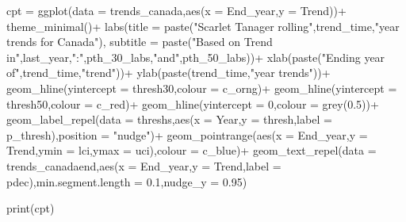 \documentclass[
]{book}
\newenvironment{Shaded}{\begin{snugshade}}{\end{snugshade}}
\newcommand{\AttributeTok}[1]{\textcolor[rgb]{0.77,0.63,0.00}{#1}}
\newcommand{\DecValTok}[1]{\textcolor[rgb]{0.00,0.00,0.81}{#1}}
\newcommand{\FloatTok}[1]{\textcolor[rgb]{0.00,0.00,0.81}{#1}}
\newcommand{\FunctionTok}[1]{\textcolor[rgb]{0.00,0.00,0.00}{#1}}
\newcommand{\NormalTok}[1]{#1}
\newcommand{\OtherTok}[1]{\textcolor[rgb]{0.56,0.35,0.01}{#1}}
\newcommand{\SpecialCharTok}[1]{\textcolor[rgb]{0.00,0.00,0.00}{#1}}
\newcommand{\StringTok}[1]{\textcolor[rgb]{0.31,0.60,0.02}{#1}}
\begin{document}
\begin{Shaded}
\begin{Highlighting}[]
      
\NormalTok{    cpt }\OtherTok{=} \FunctionTok{ggplot}\NormalTok{(}\AttributeTok{data =}\NormalTok{ trends\_canada,}\FunctionTok{aes}\NormalTok{(}\AttributeTok{x =}\NormalTok{ End\_year,}\AttributeTok{y =}\NormalTok{ Trend))}\SpecialCharTok{+}
      \FunctionTok{theme\_minimal}\NormalTok{()}\SpecialCharTok{+}
      \FunctionTok{labs}\NormalTok{(}\AttributeTok{title =} \FunctionTok{paste}\NormalTok{(}\StringTok{"Scarlet Tanager rolling"}\NormalTok{,trend\_time,}\StringTok{"year trends for Canada"}\NormalTok{),}
           \AttributeTok{subtitle =} \FunctionTok{paste}\NormalTok{(}\StringTok{"Based on Trend in"}\NormalTok{,last\_year,}\StringTok{":"}\NormalTok{,pth\_30\_labs,}\StringTok{"and"}\NormalTok{,pth\_50\_labs))}\SpecialCharTok{+}
           \FunctionTok{xlab}\NormalTok{(}\FunctionTok{paste}\NormalTok{(}\StringTok{"Ending year of"}\NormalTok{,trend\_time,}\StringTok{"trend"}\NormalTok{))}\SpecialCharTok{+}
           \FunctionTok{ylab}\NormalTok{(}\FunctionTok{paste}\NormalTok{(trend\_time,}\StringTok{"year trends"}\NormalTok{))}\SpecialCharTok{+}
      \FunctionTok{geom\_hline}\NormalTok{(}\AttributeTok{yintercept =}\NormalTok{ thresh30,}\AttributeTok{colour =}\NormalTok{ c\_orng)}\SpecialCharTok{+}
      \FunctionTok{geom\_hline}\NormalTok{(}\AttributeTok{yintercept =}\NormalTok{ thresh50,}\AttributeTok{colour =}\NormalTok{ c\_red)}\SpecialCharTok{+}
      \FunctionTok{geom\_hline}\NormalTok{(}\AttributeTok{yintercept =} \DecValTok{0}\NormalTok{,}\AttributeTok{colour =} \FunctionTok{grey}\NormalTok{(}\FloatTok{0.5}\NormalTok{))}\SpecialCharTok{+}
      \FunctionTok{geom\_label\_repel}\NormalTok{(}\AttributeTok{data =}\NormalTok{ threshs,}\FunctionTok{aes}\NormalTok{(}\AttributeTok{x =}\NormalTok{ Year,}\AttributeTok{y =}\NormalTok{ thresh,}\AttributeTok{label =}\NormalTok{ p\_thresh),}\AttributeTok{position =} \StringTok{"nudge"}\NormalTok{)}\SpecialCharTok{+}
      \FunctionTok{geom\_pointrange}\NormalTok{(}\FunctionTok{aes}\NormalTok{(}\AttributeTok{x =}\NormalTok{ End\_year,}\AttributeTok{y =}\NormalTok{ Trend,}\AttributeTok{ymin =}\NormalTok{ lci,}\AttributeTok{ymax =}\NormalTok{ uci),}\AttributeTok{colour =}\NormalTok{ c\_blue)}\SpecialCharTok{+}
      \FunctionTok{geom\_text\_repel}\NormalTok{(}\AttributeTok{data =}\NormalTok{ trends\_canadaend,}\FunctionTok{aes}\NormalTok{(}\AttributeTok{x =}\NormalTok{ End\_year,}\AttributeTok{y =}\NormalTok{ Trend,}\AttributeTok{label =}\NormalTok{ pdec),}\AttributeTok{min.segment.length =} \FloatTok{0.1}\NormalTok{,}\AttributeTok{nudge\_y =} \FloatTok{0.95}\NormalTok{)}

      
      

  \FunctionTok{print}\NormalTok{(cpt)}
 
\end{Highlighting}
\end{Shaded}
\end{document}
